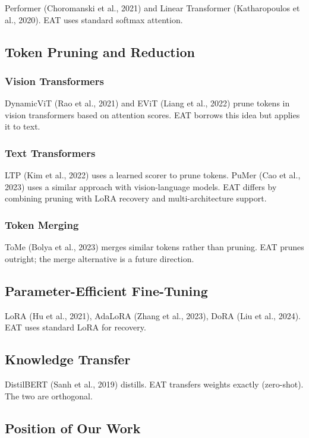 Performer (Choromanski et al., 2021) and Linear Transformer (Katharopoulos 
et al., 2020). EAT uses standard softmax attention.

\subsection{Token Pruning and Reduction}

\subsubsection{Vision Transformers}

DynamicViT (Rao et al., 2021) and EViT (Liang et al., 2022) prune tokens in 
vision transformers based on attention scores. EAT borrows this idea but 
applies it to text.

\subsubsection{Text Transformers}

LTP (Kim et al., 2022) uses a learned scorer to prune tokens. PuMer (Cao et 
al., 2023) uses a similar approach with vision-language models. EAT differs 
by combining pruning with LoRA recovery and multi-architecture support.

\subsubsection{Token Merging}

ToMe (Bolya et al., 2023) merges similar tokens rather than pruning. EAT 
prunes outright; the merge alternative is a future direction.

\subsection{Parameter-Efficient Fine-Tuning}

LoRA (Hu et al., 2021), AdaLoRA (Zhang et al., 2023), DoRA (Liu et al., 2024). 
EAT uses standard LoRA for recovery.

\subsection{Knowledge Transfer}

DistilBERT (Sanh et al., 2019) distills. EAT transfers weights exactly 
(zero-shot). The two are orthogonal.

\subsection{Position of Our Work}

